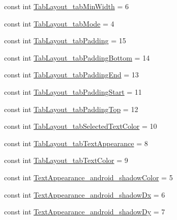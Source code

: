 \begin{DoxyCompactItemize}
\item 
const int \mbox{\hyperlink{class_f_w_p_s___app_1_1_droid_1_1_resource_1_1_styleable_a0d034f25c0b12f63bbe39d78514e0e21}{Tab\+Layout\+\_\+tab\+Min\+Width}} = 6
\item 
const int \mbox{\hyperlink{class_f_w_p_s___app_1_1_droid_1_1_resource_1_1_styleable_a00f882b2575d9fc4a144e283428e4b76}{Tab\+Layout\+\_\+tab\+Mode}} = 4
\item 
const int \mbox{\hyperlink{class_f_w_p_s___app_1_1_droid_1_1_resource_1_1_styleable_a162f485a53fcd9c25a154e9d498d2bd3}{Tab\+Layout\+\_\+tab\+Padding}} = 15
\item 
const int \mbox{\hyperlink{class_f_w_p_s___app_1_1_droid_1_1_resource_1_1_styleable_aa218e8b55dc7176f8ebfa96a861fc0cf}{Tab\+Layout\+\_\+tab\+Padding\+Bottom}} = 14
\item 
const int \mbox{\hyperlink{class_f_w_p_s___app_1_1_droid_1_1_resource_1_1_styleable_a82efdf6fc94b4c3f460a454379293dd0}{Tab\+Layout\+\_\+tab\+Padding\+End}} = 13
\item 
const int \mbox{\hyperlink{class_f_w_p_s___app_1_1_droid_1_1_resource_1_1_styleable_a8416b392f6968634f5acb156fcac3aa4}{Tab\+Layout\+\_\+tab\+Padding\+Start}} = 11
\item 
const int \mbox{\hyperlink{class_f_w_p_s___app_1_1_droid_1_1_resource_1_1_styleable_a095e7a193efe420781801e65a88e0bc6}{Tab\+Layout\+\_\+tab\+Padding\+Top}} = 12
\item 
const int \mbox{\hyperlink{class_f_w_p_s___app_1_1_droid_1_1_resource_1_1_styleable_af1e4b87aba3b56ed05237784645e477b}{Tab\+Layout\+\_\+tab\+Selected\+Text\+Color}} = 10
\item 
const int \mbox{\hyperlink{class_f_w_p_s___app_1_1_droid_1_1_resource_1_1_styleable_ab5d44cc789ebf7a4efbac497cb063f2f}{Tab\+Layout\+\_\+tab\+Text\+Appearance}} = 8
\item 
const int \mbox{\hyperlink{class_f_w_p_s___app_1_1_droid_1_1_resource_1_1_styleable_aad399ea95326e124a3bd719f1adf1a70}{Tab\+Layout\+\_\+tab\+Text\+Color}} = 9
\item 
const int \mbox{\hyperlink{class_f_w_p_s___app_1_1_droid_1_1_resource_1_1_styleable_a6654be73e60177e0e87393c13881704a}{Text\+Appearance\+\_\+android\+\_\+shadow\+Color}} = 5
\item 
const int \mbox{\hyperlink{class_f_w_p_s___app_1_1_droid_1_1_resource_1_1_styleable_ad1cca579325b1aac48bfeb3faa25e9bb}{Text\+Appearance\+\_\+android\+\_\+shadow\+Dx}} = 6
\item 
const int \mbox{\hyperlink{class_f_w_p_s___app_1_1_droid_1_1_resource_1_1_styleable_ae5a8e4564abb477b55ae983c994189ad}{Text\+Appearance\+\_\+android\+\_\+shadow\+Dy}} = 7

\end{DoxyCompactItemize}
